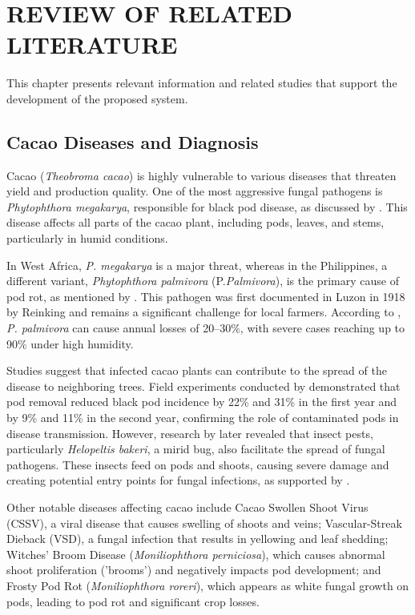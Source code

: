 \chapter{REVIEW OF RELATED LITERATURE}
This chapter presents relevant information and related studies that support the development of the proposed system.

\section{Cacao Diseases and Diagnosis}
Cacao (\textit{Theobroma cacao}) is highly vulnerable to various diseases that threaten yield and production quality. One of the most aggressive fungal pathogens is \textit{Phytophthora megakarya}, responsible for black pod disease, as discussed by \cite{Andrews1997}. This disease affects all parts of the cacao plant, including pods, leaves, and stems, particularly in humid conditions.

In West Africa, \textit{P. megakarya} is a major threat, whereas in the Philippines, a different variant, \textit{Phytophthora palmivora} (P.\textit{Palmivora}), is the primary cause of pod rot, as mentioned by \cite{Solpot2020}. This pathogen was first documented in Luzon in 1918 by Reinking and remains a significant challenge for local farmers. According to \cite{AceboGuerrero2012}, \textit{P. palmivora} can cause annual losses of 20–30\%, with severe cases reaching up to 90\% under high humidity.

Studies suggest that infected cacao plants can contribute to the spread of the disease to neighboring trees. Field experiments conducted by \cite{Ndoumbe2004} demonstrated that pod removal reduced black pod incidence by 22\% and 31\% in the first year and by 9\% and 11\% in the second year, confirming the role of contaminated pods in disease transmission. However, research by \cite{Babin2018} later revealed that insect pests, particularly \textit{Helopeltis bakeri}, a mirid bug, also facilitate the spread of fungal pathogens. These insects feed on pods and shoots, causing severe damage and creating potential entry points for fungal infections, as supported by \cite{Guest2007}.

Other notable diseases affecting cacao include Cacao Swollen Shoot Virus (CSSV), a viral disease that causes swelling of shoots and veins; Vascular-Streak Dieback (VSD), a fungal infection that results in yellowing and leaf shedding; Witches' Broom Disease (\textit{Moniliophthora perniciosa}), which causes abnormal shoot proliferation ('brooms') and negatively impacts pod development; and Frosty Pod Rot (\textit{Moniliophthora roreri}), which appears as white fungal growth on pods, leading to pod rot and significant crop losses.

